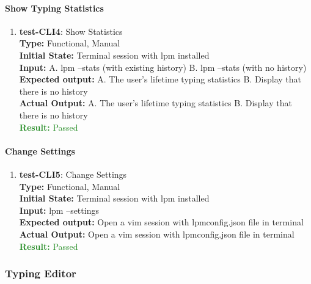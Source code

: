 \documentclass[12pt, titlepage]{article}
\begin{document}
\paragraph{Show Typing Statistics}
\begin{enumerate}

\item{\textbf{test-CLI4}: Show Statistics\\}
\textbf{Type:} Functional, Manual \\
\textbf{Initial State:} Terminal session with lpm installed \\
\textbf{Input:} A. lpm --stats (with existing history) B. lpm --stats (with no history) \\
\textbf{Expected output: }  A. The user's lifetime typing statistics B. Display that there is no history \\
\textbf{Actual Output:} A. The user's lifetime typing statistics B. Display that there is no history \\
\textcolor{ForestGreen}{\textbf{Result:} Passed}

\end{enumerate}

\paragraph{Change Settings}
\begin{enumerate}

\item{\textbf{test-CLI5}: Change Settings\\}
\textbf{Type:} Functional, Manual \\
\textbf{Initial State:} Terminal session with lpm installed \\
\textbf{Input:} lpm --settings \\
\textbf{Expected output: } Open a vim session with lpmconfig.json file in terminal \\
\textbf{Actual Output:} Open a vim session with lpmconfig.json file in terminal \\
\textcolor{ForestGreen}{\textbf{Result:} Passed}

\end{enumerate}

\subsubsection{Typing Editor}
\end{document}

